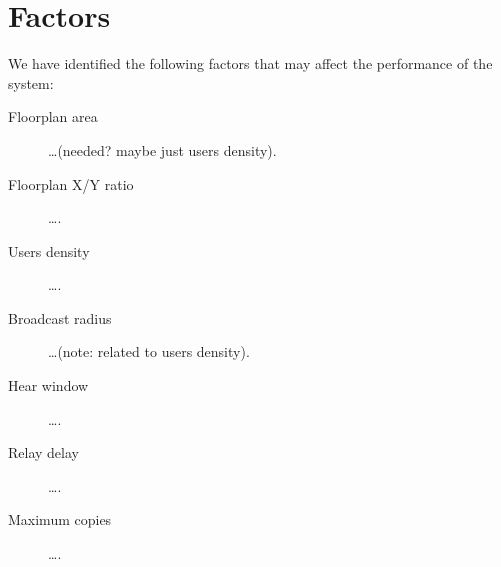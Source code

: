 \section{Factors}\label{sec:factors}

We have identified the following factors that may affect the performance of the
system:
\begin{description}
	\item[Floorplan area] \ldots (needed? maybe just users density).
	\item[Floorplan X/Y ratio] \ldots.
	\item[Users density] \ldots.
	\item[Broadcast radius] \ldots (note: related to users density).
	\item[Hear window] \ldots.
	\item[Relay delay] \ldots.
	\item[Maximum copies] \ldots.
\end{description}
